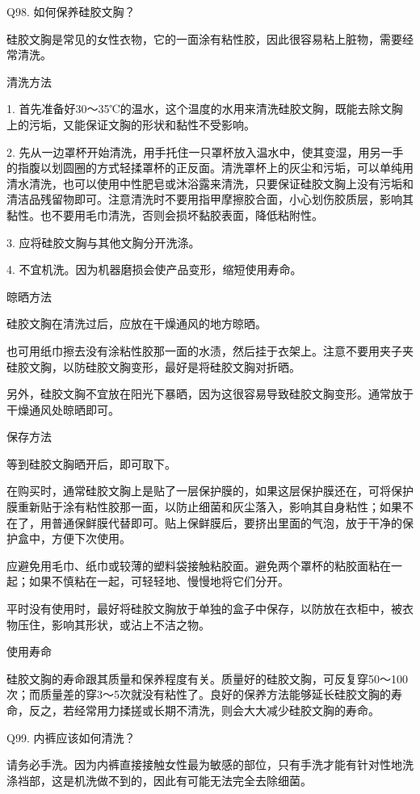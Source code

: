 \documentclass[12pt,UTF8]{ctexbook}
\begin{document}
Q98. 如何保养硅胶文胸？


硅胶文胸是常见的女性衣物，它的一面涂有粘性胶，因此很容易粘上脏物，需要经常清洗。

清洗方法

1. 首先准备好30～35℃的温水，这个温度的水用来清洗硅胶文胸，既能去除文胸上的污垢，又能保证文胸的形状和黏性不受影响。

2. 先从一边罩杯开始清洗，用手托住一只罩杯放入温水中，使其变湿，用另一手的指腹以划圆圈的方式轻揉罩杯的正反面。清洗罩杯上的灰尘和污垢，可以单纯用清水清洗，也可以使用中性肥皂或沐浴露来清洗，只要保证硅胶文胸上没有污垢和清洁品残留物即可。注意清洗时不要用指甲摩擦胶合面，小心划伤胶质层，影响其黏性。也不要用毛巾清洗，否则会损坏黏胶表面，降低粘附性。

3. 应将硅胶文胸与其他文胸分开洗涤。

4. 不宜机洗。因为机器磨损会使产品变形，缩短使用寿命。

晾晒方法

硅胶文胸在清洗过后，应放在干燥通风的地方晾晒。

也可用纸巾擦去没有涂粘性胶那一面的水渍，然后挂于衣架上。注意不要用夹子夹硅胶文胸，以防硅胶文胸变形，最好是将硅胶文胸对折晒。

另外，硅胶文胸不宜放在阳光下暴晒，因为这很容易导致硅胶文胸变形。通常放于干燥通风处晾晒即可。

保存方法

等到硅胶文胸晒开后，即可取下。

在购买时，通常硅胶文胸上是贴了一层保护膜的，如果这层保护膜还在，可将保护膜重新贴于涂有粘性胶那一面，以防止细菌和灰尘落入，影响其自身粘性；如果不在了，用普通保鲜膜代替即可。贴上保鲜膜后，要挤出里面的气泡，放于干净的保护盒中，方便下次使用。

应避免用毛巾、纸巾或较薄的塑料袋接触粘胶面。避免两个罩杯的粘胶面粘在一起；如果不慎粘在一起，可轻轻地、慢慢地将它们分开。

平时没有使用时，最好将硅胶文胸放于单独的盒子中保存，以防放在衣柜中，被衣物压住，影响其形状，或沾上不洁之物。

使用寿命

硅胶文胸的寿命跟其质量和保养程度有关。质量好的硅胶文胸，可反复穿50～100次；而质量差的穿3～5次就没有粘性了。良好的保养方法能够延长硅胶文胸的寿命，反之，若经常用力揉搓或长期不清洗，则会大大减少硅胶文胸的寿命。





Q99. 内裤应该如何清洗？


请务必手洗。因为内裤直接接触女性最为敏感的部位，只有手洗才能有针对性地洗涤裆部，这是机洗做不到的，因此有可能无法完全去除细菌。
\end{document}
